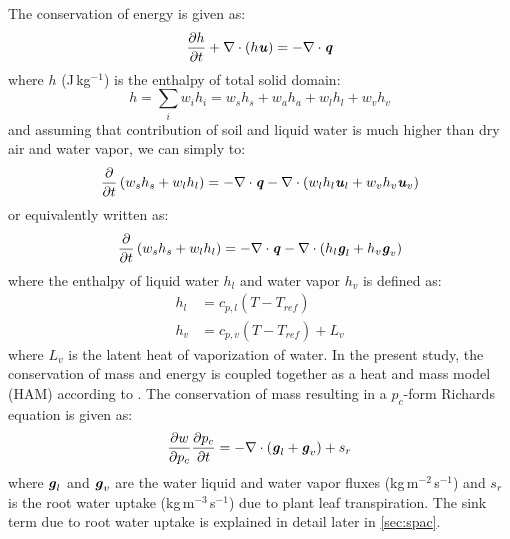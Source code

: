 The conservation of energy is given as:
\begin{equation}
\frac{\partial h}{\partial t} + \nabla \cdot \left(h \textbf{\textit{u}}\right) = - \nabla \cdot \textbf{\textit{q}}
\end{equation}
where $h$ (J\,kg$^{-1}$) is the enthalpy of total solid domain:
\begin{equation}
h = \sum_i w_i h_i = w_s h_s + w_a h_a + w_l h_l + w_v h_v
\end{equation}
and assuming that contribution of soil and liquid water is much higher than dry air and water vapor, we can simply to:
\begin{equation}
\frac{\partial}{\partial t}\left(w_s h_s + w_l h_l\right) = - \nabla \cdot \textbf{\textit{q}} - \nabla \cdot \left(w_l h_l \textbf{\textit{u}}_l + w_v h_v \textbf{\textit{u}}_v\right)
\end{equation}
or equivalently written as:
\begin{equation}
\frac{\partial}{\partial t}\left(w_s h_s + w_l h_l\right) = - \nabla \cdot \textbf{\textit{q}} - \nabla \cdot \left(h_l \textbf{\textit{g}}_l + h_v \textbf{\textit{g}}_v\right)
\end{equation}
where the enthalpy of liquid water $h_l$ and water vapor $h_v$ is defined as:
\begin{align}
h_l &= c_{p,l} \left(T - T_{\textit{ref}}\right)\\
h_v &= c_{p,v} \left(T - T_{\textit{ref}}\right) + L_v
\end{align}
where $L_v$ is the latent heat of vaporization of water. In the present study, the conservation of mass and energy is coupled together as a heat and mass model (HAM) according to \citep{Janssen2002,Defraeye2011,Carmeliet2005,Saneinejad2013,Kubilay2018}. The conservation of mass resulting in a $p_c$-form Richards equation is given as:
\begin{equation}
\frac{\partial w}{\partial p_c} \frac{\partial p_c}{\partial t} = -  \nabla \cdot \left(\textbf{\textit{g}}_l + \textbf{\textit{g}}_v\right) + s_{r}
\end{equation}
where $\textbf{\textit{g}}_l$ and $\textbf{\textit{g}}_v$ are the water liquid and water vapor fluxes (kg\,m$^{-2}$\,s$^{-1}$) and $s_r$ is the root water uptake (kg\,m$^{-3}$\,s$^{-1}$) due to plant leaf transpiration. The sink term due to root water uptake is explained in detail later in \cref{sec:spac}.

